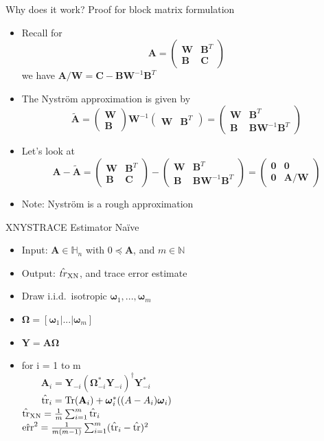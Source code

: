 \documentclass{beamer}
\newcommand{\bgk}[1]{\boldsymbol{#1}}
\newcommand{\bzero}{\bgk{0}}
\newcommand{\bomega}{\bgk{\omega}}
\newcommand{\bOmega}{\bgk{\Omega}}
\newcommand{\bvec}[1]{\mathbf{#1}}
\newcommand{\vA}{\bvec{A}}
\newcommand{\vB}{\bvec{B}}
\newcommand{\vC}{\bvec{C}}
\newcommand{\vW}{\bvec{W}}
\newcommand{\vY}{\bvec{Y}}
\newcommand{\bitem}{\item[$\bullet$]}
\begin{document}
\begin{frame}{Why does it work?}
Proof for block matrix formulation
\begin{itemize}
    \bitem Recall for 
    $$
    \vA = 
    \begin{pmatrix}
    \vW & \vB^T\\
    \vB & \vC
    \end{pmatrix}
    $$
    we have $\vA/\vW = \vC - \vB \vW^{-1} \vB^T$
    \bitem The Nystr\"om approximation is given by
    $$
    \tilde{\vA}
    =
    \begin{pmatrix}
    \vW\\ \vB
    \end{pmatrix}
    \vW^{-1}
     \begin{pmatrix}
    \vW & \vB^T
    \end{pmatrix}
    =
    \begin{pmatrix}
    \vW & \vB^T\\
    \vB & \vB \vW^{-1}\vB^T
    \end{pmatrix}
    $$
    \bitem Let's look at 
    $$
    \vA - \tilde{\vA}
    =
    \begin{pmatrix}
    \vW & \vB^T\\
    \vB & \vC
    \end{pmatrix}
    -
    \begin{pmatrix}
    \vW & \vB^T\\
    \vB & \vB \vW^{-1}\vB^T
    \end{pmatrix}
    =
    \begin{pmatrix}
    \bzero & \bzero\\
    \bzero & \vA/\vW
    \end{pmatrix}
    $$
    \bitem Note: Nystr\"om is a rough approximation
\end{itemize}
    
\end{frame}

\begin{frame}{XN{\small YS}T{\small RACE} Estimator Na\"ive}

\begin{itemize}
    \bitem Input: $\vA \in \mathbb{H}_n$ with $0\preccurlyeq\vA $, and $m\in\mathbb{N}$
    \bitem Output: $\hat{tr}_{\rm XN}$, and trace error estimate
    \bitem Draw i.i.d.~isotropic $\bomega_1,...,\bomega_m$
    \bitem $\bOmega = [\bomega_1|...|\bomega_m]$
    \bitem $\vY = \vA \bOmega$
    \bitem for i = 1 to m\\
    $\qquad \vA_i = \vY_{-i} (\bOmega_{-i}^* \vY_{-i})^\dagger \vY^*_{-i}$\\
    $\qquad \hat{\rm tr}_i = {\rm Tr}(\vA_i) + \bomega_i^*((A - A_i)\bomega_i)$\\
    $\hat{\rm tr}_{\rm XN} = \frac{1}{m} \sum_{i=1}^m \hat{\rm tr}_i$\\
    $\hat{\rm err}^2 = \frac{1}{m(m-1)} \sum_{i=1}^m (\hat{\rm tr} _i - \hat{\rm tr} )^2$
\end{itemize}
\end{frame}
\end{document}
